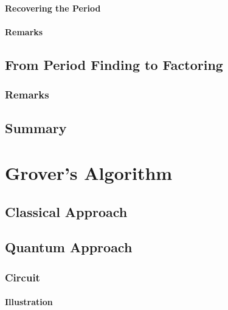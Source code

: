 				\paragraph{Recovering the Period} %

				\paragraph{Remarks} %

		\subsection{From Period Finding to Factoring} %

			\subsubsection{Remarks} %

		\subsection{Summary} %

	\section{Grover's Algorithm} %
		\label{sec:grovers}


		\subsection{Classical Approach} %

		\subsection{Quantum Approach} %

			\subsubsection{Circuit} %

				\paragraph{Illustration} %

